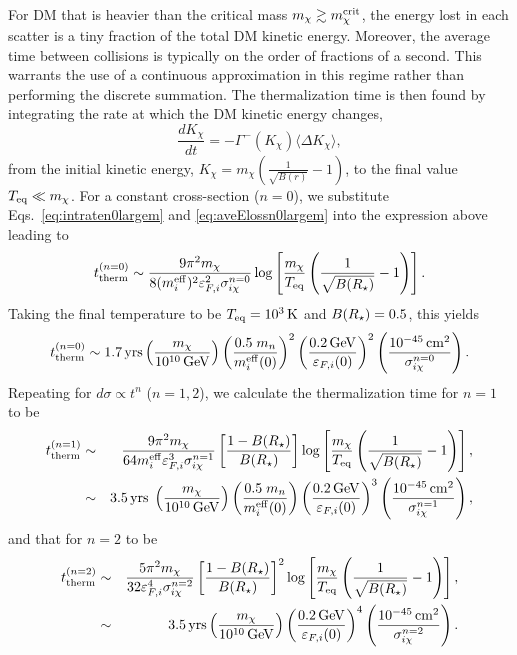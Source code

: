 For DM that is heavier than the critical mass  $m_\chi\gtrsim m_\chi^{\rm crit}$,
the energy lost in each scatter is a tiny fraction of the total DM kinetic energy. Moreover, the average time between collisions is typically on the order of fractions of a second. This warrants the use of a continuous approximation in this regime rather than performing the discrete summation. The thermalization time is then found by integrating the rate at which the DM kinetic energy changes, 
\begin{equation}
    \frac{dK_\chi}{dt} = -\Gamma^{-}(K_\chi) \langle\Delta K_\chi\rangle,  
    \label{eq:contttherm}
\end{equation}
from the initial kinetic energy, $K_\chi=m_\chi\left(\frac{1}{\sqrt{B(r)}}-1\right)$, to the final value $T_{\rm eq}\ll m_\chi$. For a constant cross-section ($n=0$), we substitute  Eqs.~\ref{eq:intraten0largem} and \ref{eq:aveElossn0largem} into the expression above leading to
\begin{equation}
    t_{\rm therm}^{(n=0)} \sim \frac{9 \pi^2 m_\chi}{8 (m_i^{\rm eff})^2 \varepsilon_{F,i}^2 \sigma_{i\chi}^{n=0}}\log\left[\frac{m_\chi}{T_{\rm eq}}\left(\frac{1}{\sqrt{B(R_\star)}}-1\right)\right].
    \label{eq:tthemheavy0}
\end{equation}
Taking the final temperature to be $T_{\rm eq}=10^3{\rm \,K}$ and $B(R_\star)=0.5$, this yields 
\begin{equation}
    t_{\rm therm}^{(n=0)} \sim 1.7  {\rm \,yrs} \left(\frac{m_\chi }{10^{10}{\rm \,GeV}}\right)\left(\frac{0.5\;m_n}{m_i^{\rm eff}(0)}\right)^{2}\left(\frac{0.2{\rm \,GeV}}{\varepsilon_{F,i}(0)}\right)^{2}\left(\frac{10^{-45}{\rm \,cm}^2}{\sigma_{i\chi}^{n=0}}\right).    
\end{equation}
%
Repeating for $d\sigma\propto t^n$ ($n=1,2$), we calculate the thermalization time for $n=1$ to be
\begin{eqnarray}
    t_{\rm therm}^{(n=1)} &\sim& \frac{9\pi^2 m_\chi}{ 64 m_i^{\rm eff} \varepsilon_{F,i}^3 \sigma_{i\chi}^{n=1}}\left[\frac{1-B(R_\star)}{B(R_\star)}\right] \log\left[\frac{m_\chi}{T_{\rm eq}} \left(\frac{1}{\sqrt{B(R_\star)}}-1\right)\right],\\
    &\sim& 3.5 {\rm \,yrs}\; \left(\frac{m_\chi}{10^{10} {\rm \,GeV}}\right)\left(\frac{0.5\;m_n}{m_i^{\rm eff}(0)}\right) \left(\frac{0.2{\rm \,GeV}}{\varepsilon_{F,i}(0)}\right)^{3}\left(\frac{10^{-45}{\rm \,cm}^2}{\sigma_{i\chi}^{n=1}}\right),
\end{eqnarray}
and that for $n=2$ to be
\begin{eqnarray}
    t_{\rm therm}^{(n=2)} &\sim& \frac{5 \pi^2 m_\chi}{ 32 \varepsilon_{F,i}^4\sigma_{i\chi}^{n=2}} \left[\frac{1-B(R_\star)}{B(R_\star)}\right]^2 \log\left[\frac{m_\chi}{T_{\rm eq}}\left(\frac{1}{\sqrt{B(R_\star)}}-1\right)\right],\\
    &\sim& 3.5 {\rm \,yrs} \left( \frac{m_\chi}{10^{10} {\rm \,GeV}}\right) \left(\frac{0.2{\rm \,GeV}}{\varepsilon_{F,i}(0)}\right)^{4}\left(\frac{10^{-45}{\rm \,cm}^2}{\sigma_{i\chi}^{n=2}}\right). 
\end{eqnarray}







